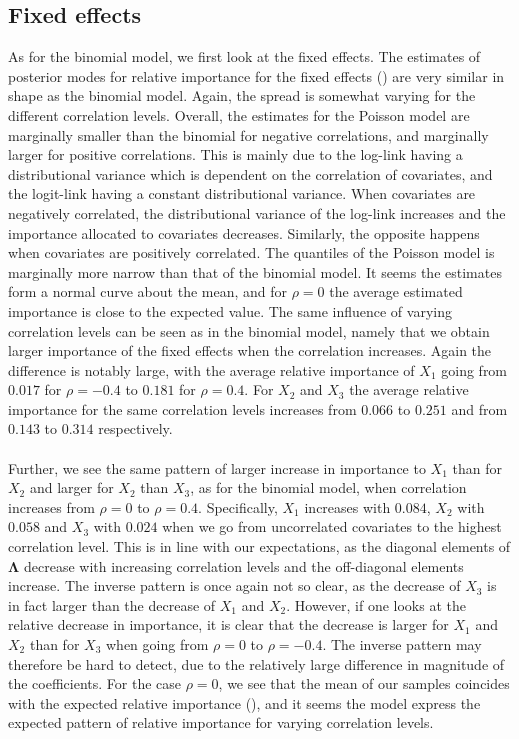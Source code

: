 \subsection{Fixed effects}
As for the binomial model, we first look at the fixed effects. The estimates of posterior modes for relative importance for the fixed effects () are very similar in shape as the binomial model. Again, the spread is somewhat varying for the different correlation levels. Overall, the estimates for the Poisson model are marginally smaller than the binomial for negative correlations, and marginally larger for positive correlations. This is mainly due to the log-link having a distributional variance which is dependent on the correlation of covariates, and the logit-link having a constant distributional variance. When covariates are negatively correlated, the distributional variance of the log-link increases and the importance allocated to covariates decreases. Similarly, the opposite happens when covariates are positively correlated. The quantiles of the Poisson model is marginally more narrow than that of the binomial model. It seems the estimates form a normal curve about the mean, and for $\rho=0$ the average estimated importance is close to the expected value. The same influence of varying correlation levels can be seen as in the binomial model, namely that we obtain larger importance of the fixed effects when the correlation increases. Again the difference is notably large, with the average relative importance of $X_1$ going from $0.017$ for $\rho=-0.4$ to $0.181$ for $\rho=0.4$. For $X_2$ and $X_3$ the average relative importance for the same correlation levels increases from $0.066$ to $0.251$ and from $0.143$ to $0.314$ respectively.
\\
\\
Further, we see the same pattern of larger increase in importance to $X_1$ than for $X_2$ and larger for $X_2$ than $X_3$, as for the binomial model, when correlation increases from $\rho=0$ to $\rho=0.4$. Specifically, $X_1$ increases with $0.084$, $X_2$ with $0.058$ and $X_3$ with $0.024$ when we go from uncorrelated covariates to the highest correlation level. This is in line with our expectations, as the diagonal elements of $\boldsymbol{\Lambda}$ decrease with increasing correlation levels and the off-diagonal elements increase. The inverse pattern is once again not so clear, as the decrease of $X_3$ is in fact larger than the decrease of $X_1$ and $X_2$. However, if one looks at the relative decrease in importance, it is clear that the decrease is larger for $X_1$ and $X_2$ than for $X_3$ when going from $\rho=0$ to $\rho=-0.4$. The inverse pattern may therefore be hard to detect, due to the relatively large difference in magnitude of the coefficients. For the case $\rho=0$, we see that the mean of our samples coincides with the expected relative importance (), and it seems the model express the expected pattern of relative importance for varying correlation levels.
